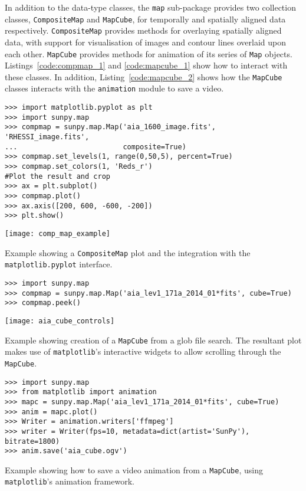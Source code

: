 In addition to the data-type classes, the \texttt{map} sub-package provides two 
collection classes, \texttt{CompositeMap} and \texttt{MapCube}, for 
temporally and spatially aligned data respectively.
\texttt{CompositeMap} provides methods for overlaying spatially aligned 
data, with support for visualisation of images and contour lines overlaid 
upon each other.
\texttt{MapCube} 
provides methods for animation of its series of \texttt{Map} objects. 
Listings~\ref{code:compmap_1} and \ref{code:mapcube_1} show how to interact 
with these classes.
In addition, Listing~\ref{code:mapcube_2} shows how the \texttt{MapCube} 
classes interacts with the \texttt{animation} module to save a video.

\begin{listing}[H]
\begin{verbatim}
>>> import matplotlib.pyplot as plt
>>> import sunpy.map
>>> compmap = sunpy.map.Map('aia_1600_image.fits', 'RHESSI_image.fits', 
...                         composite=True)
>>> compmap.set_levels(1, range(0,50,5), percent=True)
>>> compmap.set_colors(1, 'Reds_r')
#Plot the result and crop
>>> ax = plt.subplot()
>>> compmap.plot()
>>> ax.axis([200, 600, -600, -200])
>>> plt.show()
\end{verbatim}
\begin{center}
\texttt{[image: comp\_map\_example]}
\end{center}
\caption{Example showing a \texttt{CompositeMap} plot and the integration with the \texttt{matplotlib.pyplot} interface.}
\label{code:compmap_1}
\end{listing}

\begin{listing}[H]
\begin{verbatim}
>>> import sunpy.map
>>> compmap = sunpy.map.Map('aia_lev1_171a_2014_01*fits', cube=True)
>>> compmap.peek()
\end{verbatim}
\begin{center}
\texttt{[image: aia\_cube\_controls]}
\end{center}
\caption{Example showing creation of a \texttt{MapCube} from a glob file search. The 
resultant plot makes use of \texttt{matplotlib}'s interactive widgets to allow scrolling 
through the \texttt{MapCube}.}
\label{code:mapcube_1}
\end{listing}

\begin{listing}[H]
\begin{verbatim}
>>> import sunpy.map
>>> from matplotlib import animation
>>> mapc = sunpy.map.Map('aia_lev1_171a_2014_01*fits', cube=True)
>>> anim = mapc.plot()
>>> Writer = animation.writers['ffmpeg']
>>> writer = Writer(fps=10, metadata=dict(artist='SunPy'), bitrate=1800)
>>> anim.save('aia_cube.ogv')
\end{verbatim}
\caption{Example showing how to save a video animation from a \texttt{MapCube}, using 
\texttt{matplotlib}'s animation framework.}
\label{code:mapcube_2}
\end{listing}
